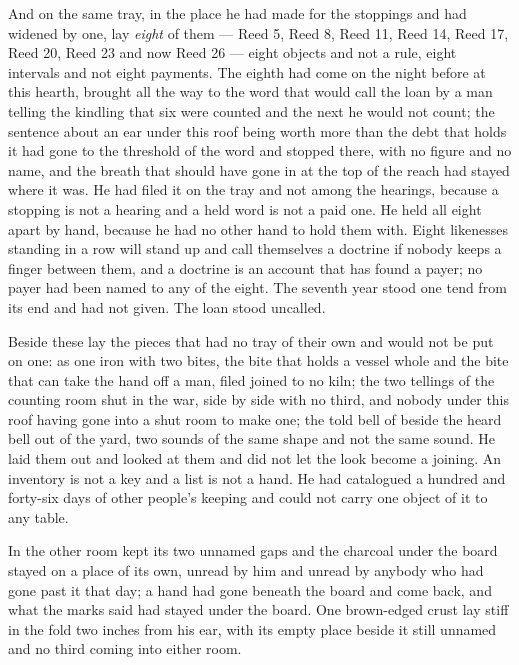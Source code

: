 And on the same tray, in the place he had made for the stoppings and had widened by one, lay \emph{eight} of them --- Reed 5, Reed 8, Reed 11, Reed 14, Reed 17, Reed 20, Reed 23 and now Reed 26 --- eight objects and not a rule, eight intervals and not eight payments. The eighth had come on the night before at this hearth, brought all the way to the word that would call the loan by a man telling the kindling that six were counted and the next he would not count; the sentence about an ear under this roof being worth more than the debt that holds it had gone to the threshold of the word and stopped there, with no figure and no name, and the breath that should have gone in at the top of the reach had stayed where it was. He had filed it on the tray and not among the hearings, because a stopping is not a hearing and a held word is not a paid one. He held all eight apart by hand, because he had no other hand to hold them with. Eight likenesses standing in a row will stand up and call themselves a doctrine if nobody keeps a finger between them, and a doctrine is an account that has found a payer; no payer had been named to any of the eight. The seventh year stood one tend from its end and had not given. The loan stood uncalled.

Beside these lay the pieces that had no tray of their own and would not be put on one:  as one iron with two bites, the bite that holds a vessel whole and the bite that can take the hand off a man, filed joined to no kiln; the two tellings of the counting room shut in the war, side by side with no third, and nobody under this roof having gone into a shut room to make one; the told bell of  beside the heard bell out of the yard, two sounds of the same shape and not the same sound. He laid them out and looked at them and did not let the look become a joining. An inventory is not a key and a list is not a hand. He had catalogued a hundred and forty-six days of other people's keeping and could not carry one object of it to any table.

\scenebreak

In the other room  kept its two unnamed gaps and the charcoal under the board stayed on a place of its own, unread by him and unread by anybody who had gone past it that day; a hand had gone beneath the board and come back, and what the marks said had stayed under the board. One brown-edged crust lay stiff in the fold two inches from his ear, with its empty place beside it still unnamed and no third coming into either room.

